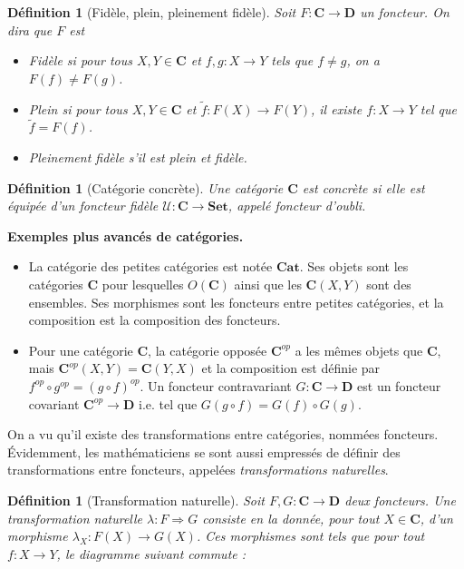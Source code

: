 \documentclass[11pt,a4paper]{article}
\newtheorem{defi}[theo]{Définition}
\newcommand{\itemz}{\item[$\triangleright$]}
\newcommand{\gr}{\textbf}
\newcommand{\il}{\textit}
\newcommand{\U}{\mathcal{U}}
\newcommand{\1}{\mathbbm{1}}
\begin{document}
\begin{defi}[Fidèle, plein, pleinement fidèle]
Soit $F : \gr{C} \to \gr{D}$ un foncteur. On dira que $F$ est
\begin{itemize}
\setlength\itemsep{-0.3em}
\itemz Fidèle si pour tous $X,Y \in \gr{C}$ et $f,g : X \to Y$ tels que $f \neq g$, on a $F(f) \neq F(g)$.
\itemz Plein si pour tous $X,Y \in \gr{C}$ et $\tilde{f} : F(X) \to F(Y)$, il existe $f : X \to Y$ tel que $\tilde{f} = F(f)$.
\itemz Pleinement fidèle s'il est plein et fidèle.
\end{itemize}
\end{defi}
\begin{defi}[Catégorie concrète]
Une catégorie $\gr{C}$ est concrète si elle est équipée d'un foncteur fidèle $\U : \gr{C} \to \gr{Set}$, appelé foncteur d'oubli.
\end{defi}
\gr{Exemples plus avancés de catégories.}
\begin{itemize}
\item La catégorie des petites catégories est notée $\gr{Cat}$. Ses objets sont les catégories $\gr{C}$ pour lesquelles $O(\gr{C})$ ainsi que les $\gr{C}(X,Y)$ sont des ensembles. Ses morphismes sont les foncteurs entre petites catégories, et la composition est la composition des foncteurs.
\item Pour une catégorie $\gr{C}$, la catégorie opposée $\gr{C}^{op}$ a les mêmes objets que $\gr{C}$, mais $\gr{C}^{op}(X,Y) = \gr{C}(Y,X)$ et la composition est définie par $f^{op} \circ g^{op} = (g \circ f)^{op}$. Un foncteur contravariant $G : \gr{C} \to \gr{D}$ est un foncteur covariant $\gr{C}^{op} \to \gr{D}$ i.e. tel que $G(g \circ f) = G(f) \circ G(g)$.
\end{itemize}
On a vu qu'il existe des transformations entre catégories, nommées foncteurs. \'Evidemment, les mathématiciens se sont aussi empressés de définir des transformations entre foncteurs, appelées \il{transformations naturelles}.
\begin{defi}[Transformation naturelle]
Soit $F,G : \gr{C} \to \gr{D}$ deux foncteurs. Une transformation naturelle $\lambda : F \Rightarrow G$ consiste en la donnée, pour tout $X \in \gr{C}$, d'un morphisme $\lambda_X : F(X) \to G(X)$. Ces morphismes sont tels que pour tout $f : X \to Y$, le diagramme suivant commute :
\begin{center}
\end{center}
\end{defi}
\end{document}
